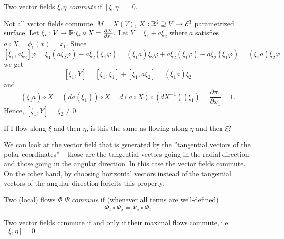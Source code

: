 \begin{definition}
	
	Two vector fields $ \xi, \eta $ \emph{commute} if $ [\xi,\eta] = 0 $.
	
\end{definition}

\begin{example}
	Not all vector fields commute. $ M = X(V) $, $ X: \mathbb R^2 \supseteq V \rightarrow \mathcal E^3 $ parametrized surface. Let $ \xi_i:V \rightarrow \mathbb R^, \xi_i\circ X = \frac{\partial X}{\partial x_i}. $ Let $ Y = \xi_1 + a\xi_2 $ where $ a $ satisfies $ a\circ X = \phi_1(x) = x_1 $. Since 
		\[ [\xi_1, a\xi_2]\varphi
		= \xi_1(a\xi_2 \varphi)- a\xi_2(\xi_1\varphi)
		= (\xi_1 a)\xi_2\varphi + a\xi_2(\xi_1\varphi) - a\xi_2(\xi_1\varphi)
		= (\xi_1 a)\xi_2\varphi \]
	we get 
		\[ [\xi_1,Y] = [\xi_1,\xi_1] + [\xi_1,a\xi_2] = (\xi_1a)\xi_2 \]
	and 
		\[ (\xi_1 a) \circ X = (da(\xi_1))\circ X = d(a \circ X) \circ (dX^{-1})(\xi_1) = \frac {\partial \pi_1}{\partial x_1} = 1.   \]
	Hence, $ [\xi_1,Y] = \xi_2 \neq 0 $.
\end{example}

If I flow along $ \xi $ and then $ \eta $, is this the same as flowing along $ \eta $ and then $ \xi $?

\begin{example}
	
	We can look at the vector field that is generated by the ''tangential vectors of the polar coordinates'' -- those are the tangential vectors going in the radial direction and those going in the angular direction. In this case the vector fields commute. On the other hand, by choosing horizontal vectors instead of the tangential vectors of the angular direction forfeits this property.  
	
\end{example}

\begin{definition}
	
	Two (local) flows $ \Phi,\Psi $ \emph{commute} if (whenever all terms are well-defined) 
		\[ \Phi_t \circ \Psi_s = \Psi_s \circ \Phi_t \]
	
\end{definition}

\begin{theorem}
	
	Two vector fields commute if and only if their maximal flows commute, i.e. $ [\xi,\eta] = 0 $	
	
\end{theorem}

